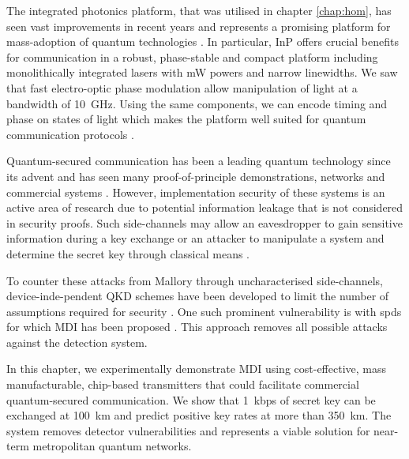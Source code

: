 The integrated photonics platform, that was utilised in chapter \ref{chap:hom}, has seen vast improvements in recent years and represents a promising platform for mass-adoption of quantum technologies \cite{thompson2011}. In particular, \ac{InP} offers crucial benefits for communication in a robust, phase-stable and compact platform including monolithically integrated lasers with mW powers and narrow linewidths. We saw that fast electro-optic phase modulation allow manipulation of light at a bandwidth of \SI{10}{GHz}. Using the same components, we can encode timing and phase on states of light which makes the platform well suited for quantum communication protocols \cite{Sibson2017InP}. 


Quantum-secured communication has been a leading quantum technology since its advent \cite{BB84, E91} and has seen many proof-of-principle demonstrations, networks and commercial systems \cite{yin2016, Rubenok2013, Comandar2016, zhang2018, commercial}. However, implementation security of these systems is an active area of research due to potential information leakage that is not considered in security proofs. Such side-channels may allow an eavesdropper to gain sensitive information during a key exchange \cite{Lo2014} or an attacker to manipulate a system and determine the secret key through classical means \cite{Lydersen2010b, lydersen2011controlling}. 

To counter these attacks from Mallory through uncharacterised side-channels, device-inde-pendent \ac{QKD} schemes have been developed to limit the number of assumptions required for security \cite{Masanes2011}. One such prominent vulnerability is with \acp{spd} for which \ac{MDI} has been proposed \cite{mdi-qkd}. This approach removes all possible attacks against the detection system.

In this chapter, we experimentally demonstrate \ac{MDI} using cost-effective, mass manufacturable, chip-based transmitters that could facilitate commercial quantum-secured communication. We show that \SI{1}{kbps} of secret key can be exchanged at  \SI{100}{km} and predict positive key rates at more than \SI{350}{km}. The system removes detector vulnerabilities and represents a viable solution for near-term metropolitan quantum networks.


